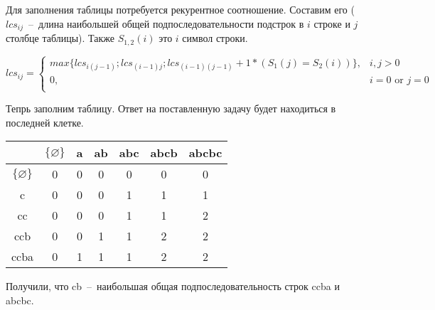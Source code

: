 \documentclass[a4paper,12pt] {report} 			%
\begin{document}
Для заполнения таблицы потребуется рекурентное соотношение. Составим его 
($lcs_{ij}$~--~длина наибольшей общей подпоследовательности подстрок в $i$ строке и $j$ столбце таблицы). 
Также $S_{1,2}(i)$ это $i$ символ строки.

\begin{center}
	\begin{equation*}
	lcs_{ij} =
		\begin{cases}
			max \{ lcs_{i(j - 1)}; lcs_{(i - 1)j}; lcs_{(i - 1)(j -1)} + 1*(S_{1}(j) = S_{2}(i)) \}, & \text{$i,j > 0$} \\
			0, & \text{$i = 0$ or $j = 0$} \\
		\end{cases}
	\end{equation*}
\end{center}

Тепрь заполним таблицу. Ответ на поставленную задачу будет находиться в последней клетке.

\begin{center}
	\begin{tabular}{ | c | c c c c c c | }
		\hline
		& $\{ \varnothing \}$ & a & ab & abc & abcb & abcbc \\
		\hline
		$\{ \varnothing \}$ & 0 & 0 & 0 & 0 & 0 & 0 \\
		c & 0 & 0 & 0 & 1 & 1 & 1 \\
		cc & 0 & 0 & 0 & 1 & 1 & 2 \\
		ccb & 0 & 0 & 1 & 1 & 2 & 2 \\
		ccba & 0 & 1 & 1 & 1 & 2 & 2\\
		\hline
	\end{tabular}
\end{center}

Получили, что cb~--~наибольшая общая подпоследовательность строк ccba и abcbc.
\end{document}
